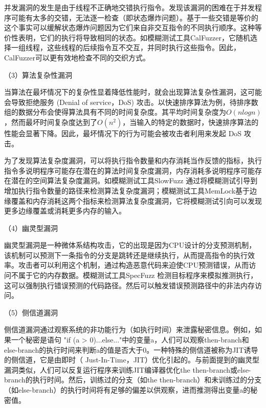 \documentclass[master]{thesis-uestc}
\begin{document}
并发漏洞的发生是由于线程不正确地交错执行指令。发现该漏洞的困难在于并发程序可能有太多的交错，无法逐一检查（即状态爆炸问题）。基于一些交错是等价的这个事实可以缓解状态爆炸问题因为它们来自非交互指令的不同执行顺序。这种等价性表明，它们的执行将导致相同的状态。如模糊测试工具CalFuzzer，它随机选择一组线程，这些线程的后续指令互不交互，并同时执行这些指令。因此，CalFuzzer可以更有效地检查不同的交织方式。

（3）算法复杂性漏洞

当算法在最坏情况下的复杂性显着降低性能时，就会出现算法复杂性漏洞，这可能会导致拒绝服务 (Denial of service，DoS) 攻击。以快速排序算法为例，待排序数组的数据分布会使得算法具有不同的时间复杂度。其平均时间复杂度为$O(nlogn)$，然而最坏时间复杂度达到了$O(n^2)$，当输入的特定的数据时，快速排序算法的性能会显著下降。因此，最坏情况下的行为可能会被攻击者利用来发起 DoS 攻击。

为了发现算法复杂度漏洞，可以将执行指令数量和内存消耗当作反馈的指标，执行指令多说明程序可能存在潜在的算法时间复杂度漏洞，内存消耗多说明程序可能存在潜在的空间算法复杂度漏洞。如模糊测试工具SlowFuzz 通过将模糊测试引导到增加执行指令数量的路径来检测算法复杂度漏洞；模糊测试工具MemLock基于边缘覆盖和内存消耗这两个指标来检测算法复杂度漏洞，它将模糊测试引向可以发现更多边缘覆盖或消耗更多内存的输入。

（4）幽灵型漏洞

幽灵型漏洞是一种微体系结构攻击，它的出现是因为CPU设计的分支预测机制，该机制可以预测下一条指令的分支是跳转还是继续执行，从而提高指令的执行效率。攻击者可以利用这个机制，通过构造恶意代码来迫使CPU预测错误，从而访问不属于它的内存数据。模糊测试工具SpecFuzz 检测目标程序来模拟推测执行，这可以强制执行错误预测的代码路径。然后可以触发错误预测路径中的非法内存访问。


（5）侧信道漏洞

侧信道漏洞通过观察系统的非功能行为（如执行时间）来泄露秘密信息。例如，如果一个秘密是语句 "if (a > 0){...}else{...}"中的变量a，人们可以观察then-branch和else-branch的执行时间来判断a的值是否大于0。一种特殊的侧信道被称为JIT诱导的侧信道，它是由即时（ Just-In-Time，JIT）优化引起的。与前面提到的幽灵型漏洞类似，人们可以反复运行程序来训练JIT编译器优化the then-branch或else-branch的执行时间。然后，训练过的分支（如the then-branch）和未训练过的分支（如else-branch）的执行时间将有足够的偏差以供观察，进而推测得出变量a的秘密值。
\end{document}
